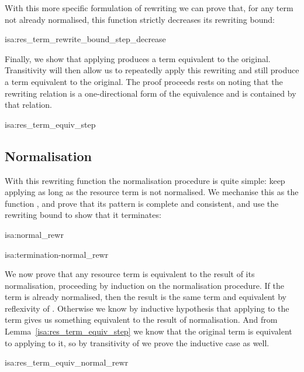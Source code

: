 \documentclass[class=smolathesis,crop=false]{standalone}
\begin{document}
With this more specific formulation of rewriting we can prove that, for any term not already normalised, this  function strictly decreases its rewriting bound:
\begin{isalemma}{isa:res_term_rewrite_bound_step_decrease}
  
\end{isalemma}

\cbstart
Finally, we show that applying  produces a term equivalent to the original.
Transitivity will then allow us to repeatedly apply this rewriting and still produce a term equivalent to the original.
The proof proceeds rests on noting that the rewriting relation is a one-directional form of the equivalence and  is contained by that relation.
\begin{isalemma}{isa:res_term_equiv_step}
  
\end{isalemma}
\cbend

\subsection{Normalisation}
\label{sec:res/rewr/normal}

With this rewriting function the normalisation procedure is quite simple: keep applying  as long as the resource term is not normalised.
We mechanise this as the function , and prove that its pattern is complete and consistent, and use the rewriting bound to show that it terminates:

\begin{isadef}{isa:normal_rewr}
  
\end{isadef}

\begin{isalemma}{isa:termination-normal_rewr}
  
\end{isalemma}

\cbstart
We now prove that any resource term is equivalent to the result of its normalisation, proceeding by induction on the normalisation procedure.
If the term is already normalised, then the result is the same term and equivalent by reflexivity of \isa{\isasymsim}.
Otherwise we know by inductive hypothesis that applying  to the term gives us something equivalent to the result of normalisation.
And from Lemma~\ref{isa:res_term_equiv_step} we know that the original term is equivalent to applying  to it, so by transitivity of \isa{\isasymsim} we prove the inductive case as well.
\begin{isalemma}{isa:res_term_equiv_normal_rewr}
  
\end{isalemma}
\cbend
\end{document}
